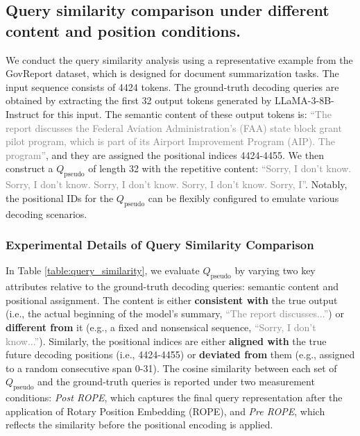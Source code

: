 \documentclass[11pt]{article}
\begin{document}
\subsection{Query similarity comparison under different content and position conditions.}
We conduct the query similarity analysis using a representative example from the GovReport dataset, which is designed for document summarization tasks. The input sequence consists of 4424 tokens. The ground-truth decoding queries are obtained by extracting the first 32 output tokens generated by LLaMA-3-8B-Instruct for this input. The semantic content of these output tokens is: \textcolor{gray}{\enquote{The report discusses the Federal Aviation Administration's (FAA) state block grant pilot program, which is part of its Airport Improvement Program (AIP). The program}}, and they are assigned the positional indices 4424-4455. We then construct a \texorpdfstring{\(Q_{\text{pseudo}}\)}{Q\_pseudo} of length 32 with the repetitive content: \textcolor{gray}{\enquote{Sorry, I don't know. Sorry, I don't know. Sorry, I don't know. Sorry, I don't know. Sorry, I}}. Notably, the positional IDs for the \texorpdfstring{\(Q_{\text{pseudo}}\)}{Q\_pseudo} can be flexibly configured to emulate various decoding scenarios.

\subsubsection{Experimental Details of Query Similarity Comparison}
In Table \ref{table:query_similarity}, we evaluate \texorpdfstring{\(Q_{\text{pseudo}}\)}{Q\_pseudo} by varying two key attributes relative to the ground-truth decoding queries: semantic content and positional assignment. The content is either \textbf{consistent with} the true output (i.e., the actual beginning of the model's summary, \textcolor{gray}{\enquote{The report discusses...}}) or \textbf{different from} it (e.g., a fixed and nonsensical sequence, \textcolor{gray}{\enquote{Sorry, I don't know...}}). Similarly, the positional indices are either \textbf{aligned with} the true future decoding positions (i.e., 4424-4455) or \textbf{deviated from} them (e.g., assigned to a random consecutive span 0-31). The cosine similarity between each set of \texorpdfstring{\(Q_{\text{pseudo}}\)}{Q\_pseudo} and the ground-truth queries is reported under two measurement conditions: \textit{Post ROPE}, which captures the final query representation after the application of Rotary Position Embedding (ROPE), and \textit{Pre ROPE}, which reflects the similarity before the positional encoding is applied.
\end{document}

